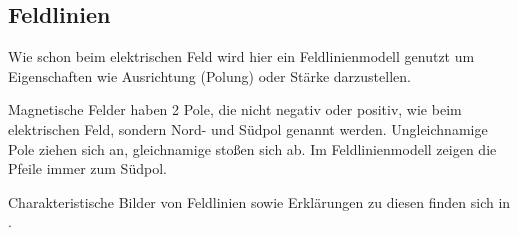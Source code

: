 




%
%	






\subsection{Feldlinien}

Wie schon beim elektrischen Feld wird hier ein Feldlinienmodell genutzt um Eigenschaften wie Ausrichtung (Polung) oder Stärke darzustellen. 

Magnetische Felder haben 2 Pole, die nicht negativ oder positiv, wie beim elektrischen Feld, sondern Nord- und Südpol genannt werden. Ungleichnamige Pole ziehen sich an, gleichnamige stoßen sich ab. Im Feldlinienmodell zeigen die Pfeile immer zum Südpol.

Charakteristische Bilder von Feldlinien sowie Erklärungen zu diesen finden sich in .


